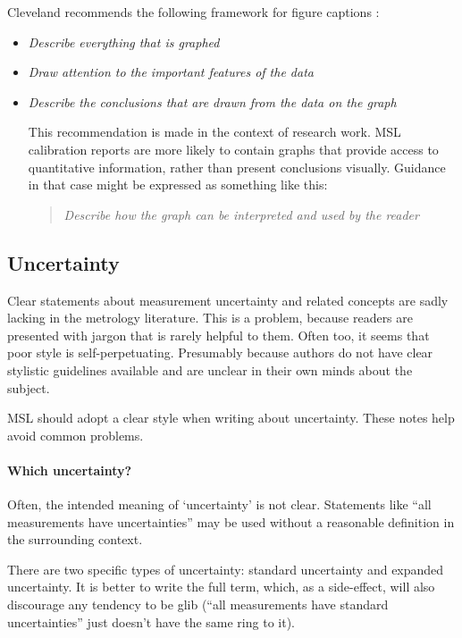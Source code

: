 Cleveland recommends the following framework for figure captions \cite{Cleveland}:
\begin{itemize}
\item	\textit{Describe everything that is graphed}
\item	\textit{Draw attention to the important features of the data}
\item	\textit{Describe the conclusions that are drawn from the data on the graph}

This recommendation is made in the context of research work. MSL calibration reports are more likely to contain graphs that provide access to quantitative information, rather than present conclusions visually. Guidance in that case might be expressed as something like this:
\begin{quote}
\textit{Describe how the graph can be interpreted and used by the reader}
\end{quote}

\end{itemize}

\subsection{Uncertainty}
Clear statements about measurement uncertainty and related concepts are sadly lacking in the metrology literature. This is a problem, because readers are presented with jargon that is rarely helpful to them. Often too, it seems that poor style is self-perpetuating. Presumably because authors do not have clear stylistic guidelines available and are unclear in their own minds about the subject. 

MSL should adopt a clear style when writing about uncertainty. These notes help avoid common problems.

\paragraph{Which uncertainty?}
Often, the intended meaning of `uncertainty' is not clear. Statements like ``all measurements have uncertainties'' may be used without a reasonable definition in the surrounding context.

There are two specific types of uncertainty: standard uncertainty and expanded uncertainty. It is better to write the full term, which, as a side-effect, will also discourage any tendency to be glib (``all measurements have standard uncertainties'' just doesn't have the same ring to it). 

